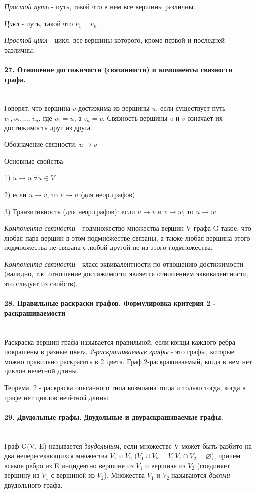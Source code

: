 \documentclass[a4paper, 12pt]{article}
\newcommand{\parag}[1]{\paragraph{#1}\mbox{}\\}
\begin{document}
\noindent
\textit{Простой путь} - путь, такой что в нем все вершины различны.

\noindent
\textit{Цикл} - путь, такой что $v_{1} = v_{n}$

\noindent
\textit{Простой цикл} - цикл, все вершины которого, кроме первой и последней различны.

\parag{27. Отношение достижимости (связанности) и компоненты связности графа.}
Говорят, что вершина $v$ достижима из вершины $u$, если существует путь $v_{1}, v_{2}, ..., v_{n}$, где $v_{1} = u$, а $v_{n} = v$.
Связность вершины $u$ и $v$ означает их достижимость друг из друга.

\noindent
Обозначение связности: $u \rightarrow v$

\noindent
Основные свойства:

1) $u \rightarrow u\ \forall u \in V$

2) если $u \rightarrow v$, то $v \rightarrow u$ (для неор.графов)

3) Транзитивность (для неор.графов): если  $u \rightarrow v$ и  $v \rightarrow w$, то  $u \rightarrow w$

\noindent
\textit{Компонента связности} - подмножество множества вершин V графа G такое, что любая пара вершин в этом подмножестве связаны, а также любая вершина этого подмножества не связана с любой другой не из этого подмножества.

\noindent
\textit{Компонента связности} - класс эквивалентности по отношению достижимости (валидно, т.к. отношение достижимости является отношением эквивалентности, это следует из свойств).

\parag{28. Правильные раскраски графов. Формулировка критерия 2 - раскрашиваемости}
Раскраска вершин графа называется правильной, если концы каждого ребра покрашены в разные цвета. \textit{2-раскрашиваемые графы} - это графы, которые можно правильно раскрасить в 2 цвета. Граф 2-раскрашиваемый, когда в нем нет циклов нечетной длины. 

\noindent
Теорема. 2 - раскраска описанного типа возможна тогда и только тогда, когда в графе нет циклов нечётной длины.

\parag{29. Двудольные графы. Двудольные и двураскрашиваемые графы.}
Граф G(V, E) называется \textit{двудольным}, если множество V может быть разбито на два непересекающихся множества $V_{1}$ и $V_{2}$ ($V_{1} \cup V_{2} = V, V_{1} \cap V_{2} = \varnothing$), причем всякое ребро из E инцидентно вершине из $V_{1}$ и вершине из $V_{2}$ (соединяет вершину из $V_{1}$ с вершиной из $V_{2}$). Множества $V_{1}$ и $V_{2}$ называются \textit{долями} двудольного графа.
\end{document}
